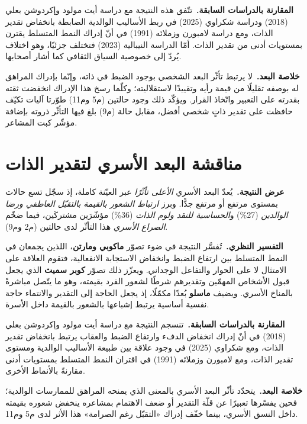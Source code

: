 \noindent\textbf{المقارنة بالدراسات السابقة.}\ تتّفق هذه النتيجة مع دراسة أيت مولود وإكردوشن بعلي
(2018) ودراسة شكراوي (2025) في ربط الأساليب الوالدية الضابطة بانخفاض تقدير الذات، ومع دراسة
لامبورن وزملائه (1991) في أنّ إدراك النمط المتسلط يقترن بمستويات أدنى من تقدير الذات. أمّا
الدراسة النيبالية (2023) فتختلف جزئيًا، وهو اختلاف يُردّ إلى خصوصية السياق الثقافي كما أشار
أصحابها.

\noindent\textbf{خلاصة البعد.}\ لا يرتبط تأثّر البعد الشخصي بوجود الضبط في ذاته، وإنّما بإدراك
المراهق له بوصفه تقليلًا من قيمة رأيه وتقييدًا لاستقلاليته؛ وكلّما رسخ هذا الإدراك انخفضت ثقته
بقدرته على التعبير واتّخاذ القرار. ويؤكّد ذلك وجود حالتين (م5 وم11) طوّرتا آليات تكيّف حافظت على
تقدير ذاتٍ شخصي أفضل، مقابل حالة (م9) بلغ فيها التأثّر ذروته بإضافة مؤشّر كبت المشاعر.

\section{مناقشة البعد الأسري لتقدير الذات}
\noindent\textbf{عرض النتيجة.}\ يُعدّ البعد الأسري \emph{الأعلى تأثّرًا} عبر العيّنة كاملة، إذ
سجّل تسع حالات بمستوى مرتفع أو مرتفع جدًّا. وبرز \emph{ارتباط الشعور بالقيمة بالتقبّل العاطفي
ورضا الوالدين} (27\%) و\emph{الحساسية للنقد ولوم الذات} (36\%) مؤشّرَين مشتركَين، فيما ضخّم
\emph{الصراع الأسري} هذا التأثّر لدى حالتين (م2 وم9).

\noindent\textbf{التفسير النظري.}\ تُفسَّر النتيجة في ضوء تصوّر \textbf{ماكوبي ومارتن}، اللذين
يجمعان في النمط المتسلط بين ارتفاع الضبط وانخفاض الاستجابة الانفعالية، فتقوم العلاقة على الامتثال
لا على الحوار والتفاعل الوجداني. ويعزّز ذلك تصوّر \textbf{كوبر سميث} الذي يجعل قبول الأشخاص
المهمّين وتقديرهم شرطًا لشعور الفرد بقيمته، وهو ما يتّصل مباشرةً بالمناخ الأسري. ويضيف
\textbf{ماسلو} بُعدًا مكمّلًا، إذ يجعل الحاجة إلى التقدير والانتماء حاجة نفسية أساسية يرتبط
إشباعها بالشعور بالقيمة داخل الأسرة.

\noindent\textbf{المقارنة بالدراسات السابقة.}\ تنسجم النتيجة مع دراسة أيت مولود وإكردوشن بعلي
(2018) في أنّ إدراك انخفاض الدفء وارتفاع الضبط والعقاب يرتبط بانخفاض تقدير الذات، ومع شكراوي
(2025) في وجود علاقة بين طبيعة الأساليب الوالدية ومستوى تقدير الذات، ومع لامبورن وزملائه (1991)
في اقتران النمط المتسلط بمستويات أدنى مقارنةً بالأنماط الأخرى.

\noindent\textbf{خلاصة البعد.}\ يتحدّد تأثّر البعد الأسري بالمعنى الذي يمنحه المراهق للممارسات
الوالدية؛ فحين يفسّرها تعبيرًا عن قلّة التقدير أو ضعف الاهتمام بمشاعره ينخفض شعوره بقيمته داخل
النسق الأسري، بينما خفّف إدراك «التقبّل رغم الصرامة» هذا الأثر لدى م5 وم11.

